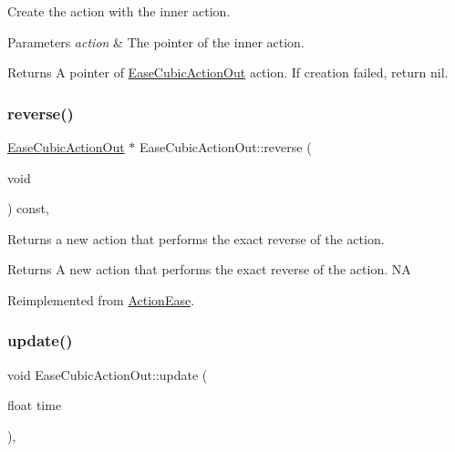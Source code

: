 Create the action with the inner action. 


\begin{DoxyParams}{Parameters}
{\em action} & The pointer of the inner action. \\
\hline
\end{DoxyParams}
\begin{DoxyReturn}{Returns}
A pointer of \hyperlink{classEaseCubicActionOut}{Ease\+Cubic\+Action\+Out} action. If creation failed, return nil. 
\end{DoxyReturn}
\mbox{\label{classEaseCubicActionOut_a739aa8e9008ddd302ac95eb64c804d11}} 
\subsubsection{\texorpdfstring{reverse()}{reverse()}}
{\footnotesize\ttfamily \hyperlink{classEaseCubicActionOut}{Ease\+Cubic\+Action\+Out} $\ast$ Ease\+Cubic\+Action\+Out\+::reverse (\begin{DoxyParamCaption}\item[{void}]{ }\end{DoxyParamCaption}) const\hspace{0.3cm}{\ttfamily [override]}, {\ttfamily [virtual]}}

Returns a new action that performs the exact reverse of the action.

\begin{DoxyReturn}{Returns}
A new action that performs the exact reverse of the action.  NA 
\end{DoxyReturn}


Reimplemented from \hyperlink{classActionEase_ab99eb083fa033fae1d6c948fdc730782}{Action\+Ease}.

\mbox{\label{classEaseCubicActionOut_a2bebf38d7167886e1ae4643b92e05d72}} 
\subsubsection{\texorpdfstring{update()}{update()}}
{\footnotesize\ttfamily void Ease\+Cubic\+Action\+Out\+::update (\begin{DoxyParamCaption}\item[{float}]{time }\end{DoxyParamCaption})\hspace{0.3cm}{\ttfamily [override]}, {\ttfamily [virtual]}}

